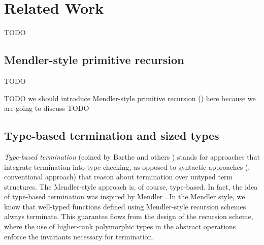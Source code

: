\section{Related Work}\label{sec:relwork}
TODO

\subsection{Mendler-style primitive recursion}\label{sec:relwork:mpr}
TODO

TODO
we should introduce Mendler-style primitive recursion (\mpr{}) here
because we are going to discuss \mprsi{}
TODO

\subsection{Type-based termination and sized types}\label{sec:relwork:sized}
\emph{Type-based termination} (coined by Barthe and others \cite{BartheFGPU04})
stands for approaches that integrate termination into type checking,
as opposed to syntactic approaches (\ie, conventional approach) that
reason about termination over untyped term structures.
The Mendler-style approach is, of course, type-based. In fact, the idea of
type-based termination was inspired by Mendler \cite{Mendler87,Mendler91}.
In the Mendler style, we know that well-typed functions defined using
Mendler-style recursion schemes always terminate.  This guarantee flows
from the design of the recursion scheme, where the use of higher-rank 
polymorphic types in the abstract operations enforce the invariants
necessary for termination.

